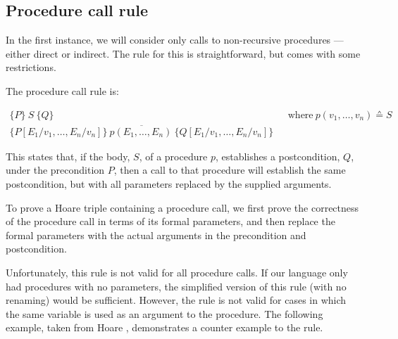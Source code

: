 \subsection{Procedure call rule}

In the first instance, we will consider only calls to non-recursive procedures --- either direct or indirect. The rule for this is straightforward, but comes with some restrictions. 

The procedure call rule is:

\begin{displaymath}
 \begin{array}{cc}
  \{P\}~S~ \{Q\} & ~~~\textrm{where}~ p(v_1,\ldots,v_n) \sdef S\\
\overline{\{P  [E_1/v_1, \ldots, E_n/v_n]\} ~p(E_1, \ldots, E_n)~ \{Q [E_1/v_1, \ldots, E_n/v_n]\}}
 \end{array}
\end{displaymath}

This states that, if the body, $S$, of a procedure $p$, establishes a postcondition, $Q$, under the precondition $P$, then a call to that procedure will establish the same postcondition, but with all parameters replaced by the supplied arguments.

To prove a Hoare triple containing a procedure call, we first prove the correctness of the procedure call in terms of its formal parameters, and then replace the formal parameters with the actual arguments in the precondition and postcondition.

Unfortunately, this rule is not valid for all procedure calls. If our language only had procedures with no parameters, the simplified version of this rule (with no renaming) would be sufficient. However, the rule is not valid for cases in which the same variable is used as an argument to the procedure. The following example, taken from Hoare \cite{hoare71}, demonstrates a counter example to the rule.

